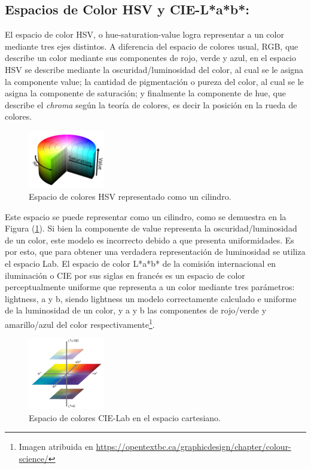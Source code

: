 \subsection{Espacios de Color HSV y CIE-L*a*b*:}
El espacio de color HSV, o hue-saturation-value logra representar a un color mediante tres ejes distintos. A diferencia del espacio de colores usual, RGB, que describe un color mediante sus componentes de rojo, verde y azul, en el espacio HSV se describe mediante la oscuridad/luminosidad del color, al cual se le asigna la componente value; la cantidad de pigmentación o pureza del color, al cual se le asigna la componente de saturación; y finalmente la componente de hue, que describe el \textit{chroma} según la teoría de colores, es decir la posición en la rueda de colores.

\begin{figure}[H]
		\centering
		\includegraphics[width=0.3\textwidth]{Imagenes/hsv.png}
		\caption{Espacio de colores HSV representado como un cilindro.}
		\label{fig:hsv}
\end{figure}

Este espacio se puede representar como un cilindro, como se demuestra en la Figura (\ref{fig:hsv}). Si bien la componente de value representa la oscuridad/luminosidad de un color, este modelo es incorrecto debido a que presenta uniformidades. Es por esto, que para obtener una verdadera representación de luminosidad se utiliza el espacio Lab.
El espacio de color L*a*b* de la comisión internacional en iluminación o CIE por sus siglas en francés es un espacio de color perceptualmente uniforme que representa a un color mediante tres parámetros: lightness, a y b, siendo lightness un modelo correctamente calculado e uniforme de la luminosidad de un color, y a y b las componentes de rojo/verde y amarillo/azul del color respectivamente\footnote{Imagen atribuida en \href{https://opentextbc.ca/graphicdesign/chapter/colour-science/}{https:\slash \slash opentextbc.ca\slash graphicdesign\slash chapter\slash colour-science\slash}}.
\begin{figure}[H]
		\centering
		\includegraphics[width=0.3\textwidth]{Imagenes/lab.png}
		\caption{Espacio de colores CIE-Lab en el espacio cartesiano.}
		\label{fig:lab}
\end{figure}

